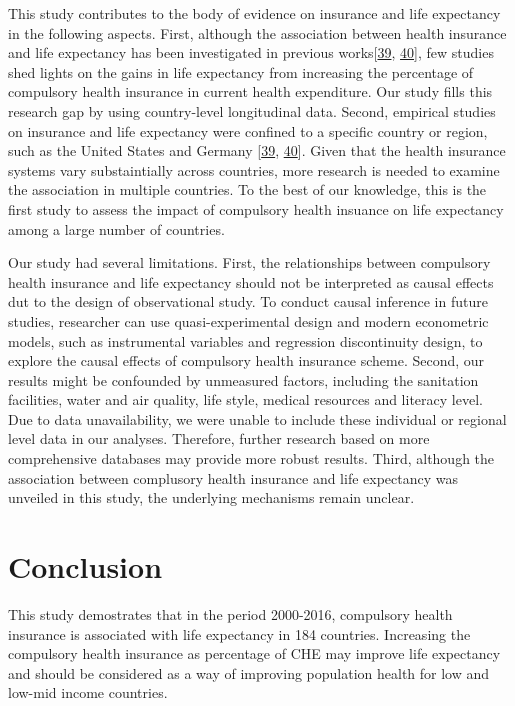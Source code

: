 \documentclass[]{elsarticle} %
\begin{document}
This study contributes to the body of evidence on insurance and life expectancy in the following aspects. First, although the association between health insurance and life expectancy has been investigated in previous works{[}\protect\hyperlink{ref-bauernschuster2017bismarck}{39}, \protect\hyperlink{ref-Curtis1997}{40}{]}, few studies shed lights on the gains in life expectancy from increasing the percentage of compulsory health insurance in current health expenditure. Our study fills this research gap by using country-level longitudinal data. Second, empirical studies on insurance and life expectancy were confined to a specific country or region, such as the United States and Germany {[}\protect\hyperlink{ref-bauernschuster2017bismarck}{39}, \protect\hyperlink{ref-Curtis1997}{40}{]}. Given that the health insurance systems vary substaintially across countries, more research is needed to examine the association in multiple countries. To the best of our knowledge, this is the first study to assess the impact of compulsory health insuance on life expectancy among a large number of countries.

Our study had several limitations. First, the relationships between compulsory health insurance and life expectancy should not be interpreted as causal effects dut to the design of observational study. To conduct causal inference in future studies, researcher can use quasi-experimental design and modern econometric models, such as instrumental variables and regression discontinuity design, to explore the causal effects of compulsory health insurance scheme. Second, our results might be confounded by unmeasured factors, including the sanitation facilities, water and air quality, life style, medical resources and literacy level. Due to data unavailability, we were unable to include these individual or regional level data in our analyses. Therefore, further research based on more comprehensive databases may provide more robust results. Third, although the association between complusory health insurance and life expectancy was unveiled in this study, the underlying mechanisms remain unclear.

\hypertarget{conclusion}{%
\section{Conclusion}\label{conclusion}}

This study demostrates that in the period 2000-2016, compulsory health insurance is associated with life expectancy in 184 countries. Increasing the compulsory health insurance as percentage of CHE may improve life expectancy and should be considered as a way of improving population health for low and low-mid income countries.
\end{document}
